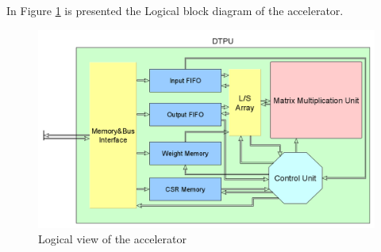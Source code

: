In Figure \ref{fig:logaccel} is presented the Logical block diagram of the accelerator.
\begin{figure}[!htbp]
\centering
\captionsetup{justification=centering}
\includegraphics[scale=0.40]{./figure/logical_view.png}
\caption{Logical view of the accelerator}
\label{fig:logaccel}
\end{figure}
